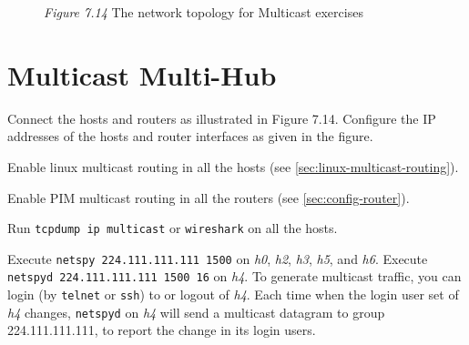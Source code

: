 \documentclass{../UTNetLab}
\begin{document}
\begin{figure}[H]
        \caption{\textit{Figure 7.14} The network topology for Multicast exercises}
        \label{fig:7.14}
    \end{figure}

\section{Multicast Multi-Hub}
    Connect the hosts and routers as illustrated in Figure 7.14.
    Configure the IP addresses of the hosts and router interfaces as given in the figure.


    Enable linux multicast routing in all the hosts (see \autoref{sec:linux-multicast-routing}).

    Enable PIM multicast routing in all the routers (see \autoref{sec:config-router}). 

    Run \lstinline{tcpdump ip multicast} or \lstinline{wireshark} on all the hosts. 

    Execute \lstinline{netspy 224.111.111.111 1500} on \textit{h0}, \textit{h2}, \textit{h3}, \textit{h5}, and \textit{h6}.
    Execute \lstinline{netspyd 224.111.111.111 1500 16} on \textit{h4}.
    To generate multicast traffic, you can login (by \lstinline{telnet} or \lstinline{ssh}) to or logout of \textit{h4}.
    Each time when the login user set of \textit{h4} changes, \lstinline{netspyd} on \textit{h4} will send a multicast datagram to group 224.111.111.111, to report the change in its login users.
\end{document}
